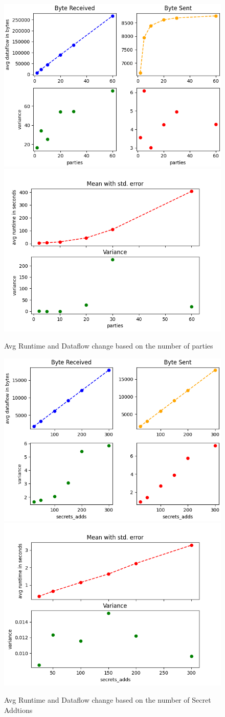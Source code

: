 \documentclass[10pt,conference,compsocconf]{IEEEtran}
\begin{document}
\begin{figure}[ht]
    \includegraphics[width=0.49\linewidth]{../performance_analysis/dataflow_num_party_change.png}
    \includegraphics[width=0.49\linewidth]{../performance_analysis/runtime_num_party_change.png}
    \caption{Avg Runtime and Dataflow change based on the number of parties}
    \label{fig:num_parties}
\end{figure}


\begin{figure}[ht]
    \centering
    \includegraphics[width=0.49\linewidth]{../performance_analysis/dataflow_secrets_additions.png}
    \includegraphics[width=0.49\linewidth]{../performance_analysis/runtime_secrets_additions.png}
    \caption{Avg Runtime and Dataflow change based on the number of Secret Addtions}
    \label{fig:num_additions}
\end{figure}
\end{document}
